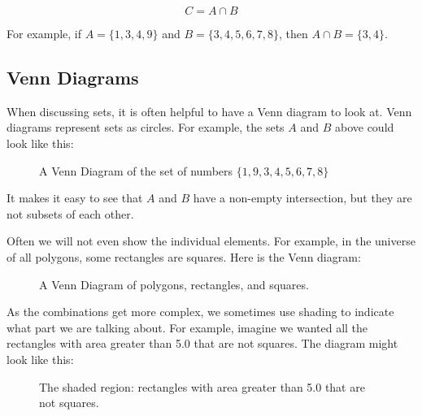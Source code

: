 $$C = A \cap B$$

For example,  if $A = \{1,3,4,9\}$ and $B = \{3,4,5,6,7,8\}$,  then $A \cap B =  \{3,4\}$.

\subsection{Venn Diagrams}

When discussing sets, it is often helpful to have a Venn diagram to
look at.  Venn diagrams represent sets as circles. For example, the
sets $A$ and $B$ above could look like this:
\begin{figure}[H]
    \centering
    \caption{A Venn Diagram of the set of numbers $\{1,9,3,4,5,6,7,8\}$}
    \label{fig:venn1}
\end{figure}

It makes it easy to see that $A$ and $B$ have a non-empty
intersection, but they are not subsets of each other.

Often we will not even show the individual elements. For example, in the
universe of all polygons, some rectangles are squares. Here is the Venn diagram:
\begin{figure}[H]
    \centering
    \caption{A Venn Diagram of polygons, rectangles, and squares.}
    \label{fig:venn2}
\end{figure}

As the combinations get more complex, we sometimes use shading to
indicate what part we are talking about. For example, imagine we
wanted all the rectangles with area greater than 5.0 that are not
squares. The diagram might look like this:
\begin{figure}[H]
    \centering
    \caption{The shaded region: rectangles with area greater than 5.0 that are not squares.}
    \label{fig:venn3}
\end{figure}


